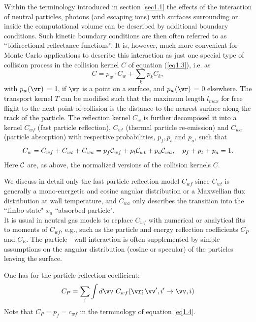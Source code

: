 Within the terminology introduced in section \ref{sec1.1} the effects
of the interaction of neutral particles, photons (and escaping ions) with
surfaces surrounding or inside the computational volume can be
described by additional boundary conditions.
Such kinetic boundary conditions are then often referred to as ``bidirectional reflectance functions''.
It is, however, much
more convenient for Monte Carlo applications to describe this
interaction as just one special type of collision process in the
collision kernel $C$ of equation (\ref{eq1.3}), i.e. as
\begin{equation} \label{eq1.14}
C   =   p_w    \cdot   C_w    + \sum_{k}  p_k   C_k   ,
\end{equation}
with $ p_w (\vr )$ = 1, if $ \vr $ is a point
on a surface, and $ p_w (\vr)$ = 0 elsewhere. The
transport kernel $T$ can be modified such that the maximum length
$ l_{max}$ for free flight to the next point of collision is the
distance to the nearest surface along the track of the particle.
The reflection kernel $ C_w$ is further decomposed it into a
kernel $ C_{wf}$ (fast particle reflection), $ C_{wt}$ (thermal
particle re-emission) and $ C_{wa}$ (particle absorption) with
respective probabilities, $ p_f , p_t$  and $ p_ a$, such that
\begin{equation}
C_w   = C_{wf}   +   C_{wt}   +   C_{wa}   =
  p_f   {\cal{C}}_{wf}   +
  p_t   {\cal{C}}_{wt}   +   p_a
{\cal{C}}_{wa}  , \quad p_f + p_t + p_a = 1 . \label{eq1.15}
\end{equation}
Here ${\cal{C}}$ are, as above, the normalized versions of the collision kernels $C$.

We discuss in detail only the fast particle reflection model $
C_{wf}$ since $C_{wt}$ is generally a mono-energetic and cosine
angular distribution or a Maxwellian flux distribution at wall
temperature, and $C_{wa}$ only describes the transition into the
``limbo state" $ x_a$ ``absorbed particle".
\\ It is usual
in neutral gas models to replace $C_{wf}$ with numerical or
analytical fits to moments of $C_{wf}$, e.g., such as the
particle and energy reflection coefficients $ C_P$ and $ C_E$. The
particle - wall interaction is often supplemented by simple
assumptions on the angular distribution (cosine or specular) of
the particles leaving the surface.

One has  for the particle reflection coefficient:
\begin{equation}
C_P   =   \sum_{i}   \int d \vv \   C_{wf} (
\vr ; \vv ' , i ' \rightarrow   \vv
,i) \label{eq1.16}
\end{equation}
Note that $ C_P   =   p_f = c_{wf}$ in the terminology of equation
\ref{eq1.4}.

